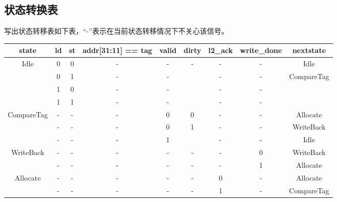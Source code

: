 \documentclass{../source/Experiment}
\begin{document}
\subsection{状态转换表}
写出状态转移表如下表，“-”表示在当前状态转移情况下不关心该信号。
\begin{table}[H]
    \begin{tabular}{|c|c|c|c|c|c|c|c|c|}
        \hline
        state                       & ld & st & addr{[}31:11{]} == tag & valid & dirty & l2\_ack & write\_done & nextstate                   \\ \hline
        \multirow{4}{*}{Idle}       & 0  & 0  & -                      & -     & -     & -       & -           & Idle                        \\ \cline{2-9}
                                    & 0  & 1  & -                      & -     &       & -       & -           & \multirow{3}{*}{CompareTag} \\ \cline{2-8}
                                    & 1  & 0  & -                      & -     &       & -       & -           &                             \\ \cline{2-8}
                                    & 1  & 1  & -                      & -     &       & -       & -           &                             \\ \hline
        \multirow{3}{*}{CompareTag} & -  & -  & -                      & 0     & 0     & -       & -           & Allocate                    \\ \cline{2-9}
                                    & -  & -  & -                      & 0     & 1     & -       & -           & WriteBack                   \\ \cline{2-9}
                                    & -  & -  & -                      & 1     &       & -       & -           & Idle                        \\ \hline
        \multirow{2}{*}{WriteBack}  & -  & -  & -                      & -     & -     & -       & 0           & WriteBack                   \\ \cline{2-9}
                                    & -  & -  & -                      & -     & -     & -       & 1           & Allocate                    \\ \hline
        \multirow{2}{*}{Allocate}   & -  & -  & -                      & -     & -     & 0       & -           & Allocate                    \\ \cline{2-9}
                                    & -  & -  & -                      & -     & -     & 1       & -           & CompareTag                  \\ \hline
    \end{tabular}
\end{table}
\end{document}
